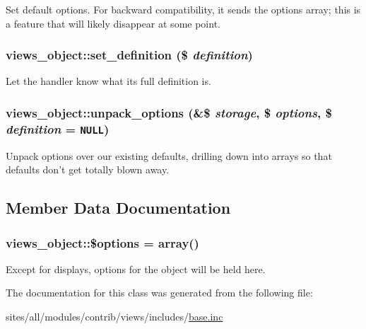 Set default options. For backward compatibility, it sends the options array; this is a feature that will likely disappear at some point. \hypertarget{classviews__object_43e41e54bd99737667224d8d3a0bdc7f}{
\subsubsection[{set\_\-definition}]{\setlength{\rightskip}{0pt plus 5cm}views\_\-object::set\_\-definition (\$ {\em definition})}}
\label{classviews__object_43e41e54bd99737667224d8d3a0bdc7f}


Let the handler know what its full definition is. \hypertarget{classviews__object_1979b404c08604c5fd45dc5ab6eaebe3}{
\subsubsection[{unpack\_\-options}]{\setlength{\rightskip}{0pt plus 5cm}views\_\-object::unpack\_\-options (\&\$ {\em storage}, \/  \$ {\em options}, \/  \$ {\em definition} = {\tt NULL})}}
\label{classviews__object_1979b404c08604c5fd45dc5ab6eaebe3}


Unpack options over our existing defaults, drilling down into arrays so that defaults don't get totally blown away. 

\subsection{Member Data Documentation}
\hypertarget{classviews__object_cfeb20d60cb18400bcfdcaa3e6c9835f}{
\subsubsection[{\$options}]{\setlength{\rightskip}{0pt plus 5cm}views\_\-object::\$options = array()}}
\label{classviews__object_cfeb20d60cb18400bcfdcaa3e6c9835f}


Except for displays, options for the object will be held here. 

The documentation for this class was generated from the following file:\begin{CompactItemize}
\item 
sites/all/modules/contrib/views/includes/\hyperlink{base_8inc}{base.inc}\end{CompactItemize}
